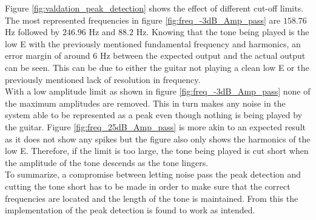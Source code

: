 Figure \ref{fig:valdation_peak_detection} shows the effect of different cut-off limits. The most represented frequencies in figure \ref{fig:freq_-3dB_Amp_pass} are $158.76$ Hz followed by $246.96$ Hz and $88.2$ Hz. 
Knowing that the tone being played is the low E with the previously mentioned fundamental frequency and harmonics, an error margin of around $6$ Hz between the expected output and the actual output can be seen.
This can be due to either the guitar not playing a clean low E or the previously mentioned lack of resolution in frequency.
\\
With a low amplitude limit as shown in figure \ref{fig:freq_-3dB_Amp_pass} none of the maximum amplitudes are removed. This in turn makes any noise in the system able to be represented as a peak even though nothing is being played by the guitar.
Figure \ref{fig:freq_25dB_Amp_pass} is more akin to an expected result as it does not show any spikes but the figure also only shows the harmonics of the low E.
Therefore, if the limit is too large, the tone being played is cut short when the amplitude of the tone descends as the tone lingers.
\\
To summarize, a compromise between letting noise pass the peak detection and cutting the tone short has to be made in order to make sure that the correct frequencies are located and the length of the tone is maintained. From this the implementation of the peak detection is found to work as intended.